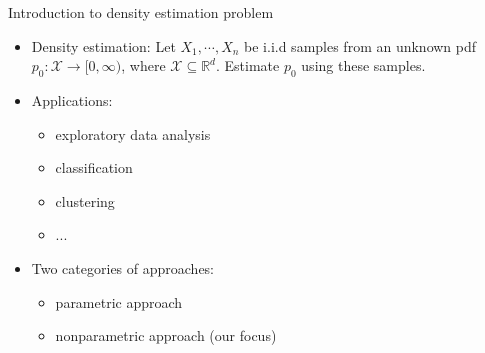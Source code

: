 \documentclass[aspectratio=169,xcolor=dvipsnames]{beamer}
\newcommand{\calX}{\mathcal{X}}
\newcommand{\Real}{\mathbb{R}}
\begin{document}
\begin{frame}{Introduction to density estimation problem}
	
	\begin{itemize}
		\item Density estimation: Let $X_1, \cdots, X_n$ be i.i.d samples from an unknown pdf $p_0: \calX \to [0, \infty)$, where $\calX \subseteq \Real^d$. Estimate $p_0$ using these samples. 
		
		\vspace{10pt}
		
		\item Applications:
		\begin{itemize}
			\item exploratory data analysis
			\item classification
			\item clustering
			\item ...
		\end{itemize}
		
		\vspace{10pt}
		
		\item Two categories of approaches: 
		\begin{itemize}
			\item parametric approach
			\item nonparametric approach (our focus)
		\end{itemize}
	\end{itemize}
	
\end{frame}


%	
%	
%		
%		
%
%		
%		
%		
%	
\end{document}

